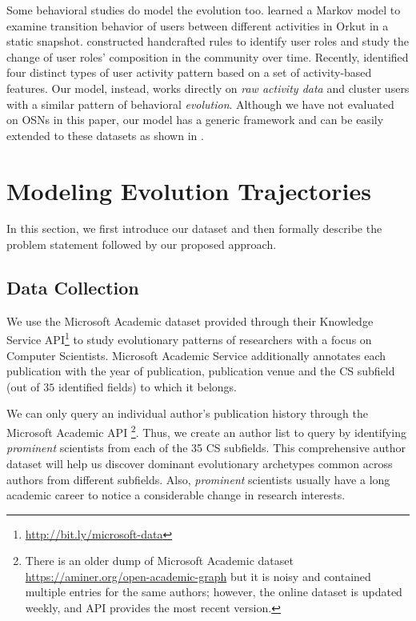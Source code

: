 \documentclass[10pt,letterpaper]{article}
\begin{document}
Some behavioral studies do model the evolution too. \cite{Benevenuto:2009} learned a Markov model to examine transition behavior of users between different activities in Orkut in a static snapshot. \cite{Angeletou:2011} constructed handcrafted rules to identify user roles and study the change of user roles' composition in the community over time. Recently, \cite{Santos:2019} identified four distinct types of user activity pattern based on a set of activity-based features. Our model, instead, works directly on \emph{raw activity data} and cluster users with a similar pattern of behavioral \emph{evolution}. Although we have not evaluated on OSNs in this paper, our model has a generic framework and can be easily extended to these datasets as shown in \cite{Anonymous2019}.

\section*{Modeling Evolution Trajectories}
In this section, we first introduce our dataset and then formally describe the problem statement followed by our proposed approach.

\subsection*{Data Collection}
We use the Microsoft Academic dataset \cite{Sinha:2015} provided through their Knowledge Service API\footnote{\url{http://bit.ly/microsoft-data}} to study evolutionary patterns of researchers with a focus on Computer Scientists.
Microsoft Academic Service additionally annotates each publication with the year of publication, publication venue and the CS subfield (out of $35$ identified fields) to which it belongs.

We can only query an individual author's publication history through the Microsoft Academic API \footnote{There is an older dump of Microsoft Academic dataset \url{https://aminer.org/open-academic-graph} but it is noisy and contained multiple entries for the same authors; however, the online dataset is updated weekly, and API provides the most recent version.}. Thus, we create an author list to query by identifying \emph{prominent} scientists from each of the 35 CS subfields. This comprehensive author dataset will help us discover dominant evolutionary archetypes common across authors from different subfields. Also, \emph{prominent} scientists usually have a long academic career to notice a considerable change in research interests.
\end{document}
